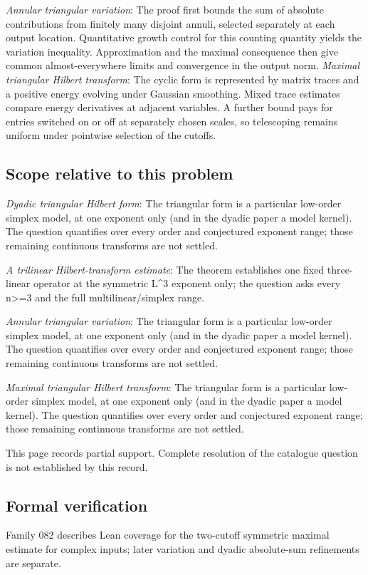 \documentclass[11pt]{article}
\begin{document}
\textit{Annular triangular variation}: The proof first bounds the sum of absolute contributions from finitely many disjoint annuli, selected separately at each output location. Quantitative growth control for this counting quantity yields the variation inequality. Approximation and the maximal consequence then give common almost-everywhere limits and convergence in the output norm. \textit{Maximal triangular Hilbert transform}: The cyclic form is represented by matrix traces and a positive energy evolving under Gaussian smoothing. Mixed trace estimates compare energy derivatives at adjacent variables. A further bound pays for entries switched on or off at separately chosen scales, so telescoping remains uniform under pointwise selection of the cutoffs.

\subsection{Scope relative to this problem}
\textit{Dyadic triangular Hilbert form}: The triangular form is a particular low-order simplex model, at one exponent only (and in the dyadic paper a model kernel). The question quantifies over every order and conjectured exponent range; those remaining continuous transforms are not settled.

\textit{A trilinear Hilbert-transform estimate}: The theorem establishes one fixed three-linear operator at the symmetric L\textasciicircum{}3 exponent only; the question asks every n>=3 and the full multilinear/simplex range.

\textit{Annular triangular variation}: The triangular form is a particular low-order simplex model, at one exponent only (and in the dyadic paper a model kernel). The question quantifies over every order and conjectured exponent range; those remaining continuous transforms are not settled.

\textit{Maximal triangular Hilbert transform}: The triangular form is a particular low-order simplex model, at one exponent only (and in the dyadic paper a model kernel). The question quantifies over every order and conjectured exponent range; those remaining continuous transforms are not settled.

This page records partial support. Complete resolution of the catalogue question is not established by this record.

\subsection{Formal verification}
Family 082 describes Lean coverage for the two-cutoff symmetric maximal estimate for complex inputs; later variation and dyadic absolute-sum refinements are separate.
\end{document}
